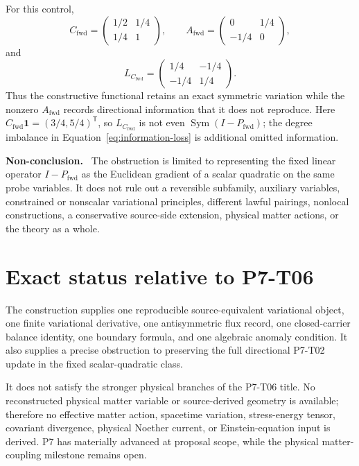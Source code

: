 \documentclass[11pt]{article}
\newenvironment{nonconclusion}{\par\smallskip\noindent\textbf{Non-conclusion.}\ }{\par\smallskip}
\newcommand{\One}{\mathbf 1}
\begin{document}
For this control,
\[
 C_{\mathrm{fwd}}
 =
 \begin{pmatrix}
 1/2&1/4\\
 1/4&1
 \end{pmatrix},
 \qquad
 A_{\mathrm{fwd}}
 =
 \begin{pmatrix}
 0&1/4\\
 -1/4&0
 \end{pmatrix},
\]
and
\[
 L_{C_{\mathrm{fwd}}}
 =
 \begin{pmatrix}
 1/4&-1/4\\
 -1/4&1/4
 \end{pmatrix}.
\]
Thus the constructive functional retains an exact symmetric variation while
the nonzero \(A_{\mathrm{fwd}}\) records directional information that it
does not reproduce.  Here \(C_{\mathrm{fwd}}\One=(3/4,5/4)^{\mathsf T}\),
so \(L_{C_{\mathrm{fwd}}}\) is not even
\(\operatorname{Sym}(I-P_{\mathrm{fwd}})\); the degree imbalance in
Equation~\eqref{eq:information-loss} is additional omitted information.

\begin{nonconclusion}
The obstruction is limited to representing the fixed linear operator
\(I-P_{\mathrm{fwd}}\) as the Euclidean gradient of a scalar quadratic on
the same probe variables.  It does not rule out a reversible subfamily,
auxiliary variables, constrained or nonscalar variational principles,
different lawful pairings, nonlocal constructions, a conservative
source-side extension, physical matter actions, or the theory as a whole.
\end{nonconclusion}

\section{Exact status relative to P7-T06}

The construction supplies one reproducible source-equivalent variational
object, one finite variational derivative, one antisymmetric flux record,
one closed-carrier balance identity, one boundary formula, and one algebraic
anomaly condition.  It also supplies a precise obstruction to preserving the
full directional P7-T02 update in the fixed scalar-quadratic class.

It does not satisfy the stronger physical branches of the P7-T06 title.
No reconstructed physical matter variable or source-derived geometry is
available; therefore no effective matter action, spacetime variation,
stress-energy tensor, covariant divergence, physical Noether current, or
Einstein-equation input is derived.  P7 has materially advanced at proposal
scope, while the physical matter-coupling milestone remains open.
\end{document}
